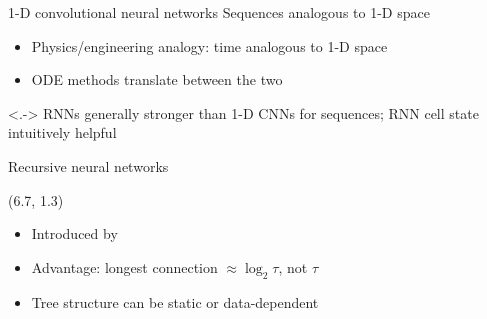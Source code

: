 \begin{frame}{1-D convolutional neural networks}
    Sequences analogous to 1-D space
    \begin{itemize}
        \item<+-> Physics/engineering analogy: time analogous to 1-D space
        \item ODE methods translate between the two
    \end{itemize}

    \vspace{-4mm}
    \begin{center}
        
        \vspace{4mm}

    \end{center}

    \uncover<.->{
        RNNs generally stronger than 1-D CNNs for sequences;
        RNN cell state intuitively helpful
    }
\end{frame}

\begin{frame}{Recursive neural networks}
    

    \begin{textblock}{5.1}(6.7, 1.3)
        \begin{itemize}
            \item Introduced by \citet{PollackAI90}
            \item Advantage: longest connection $\approx \log_2 \tau$, not $\tau$
            \item Tree structure can be static or data-dependent
        \end{itemize}
    \end{textblock}
\end{frame}

